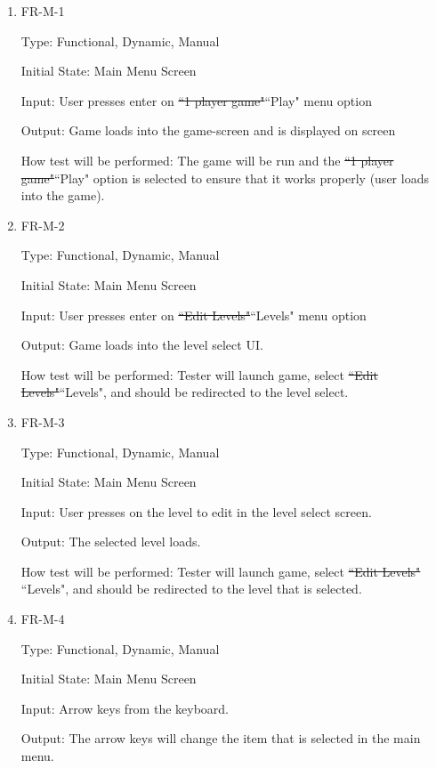\documentclass[12pt, titlepage]{article}
\begin{document}
\begin{enumerate}

\item{FR-M-1}

Type: Functional, Dynamic, Manual
					
Initial State: Main Menu Screen
					
Input: User presses enter on \color{Red}\sout{``1 player game"}``Play" \color{Black} menu option
					
Output: Game loads into the game-screen and is displayed on screen
					
How test will be performed: The game will be run and the \color{Red}\sout{``1 player game"}``Play"\color{Black} option is selected to ensure that it works properly (user loads into the game).
					
\item{FR-M-2}

Type: Functional, Dynamic, Manual
					
Initial State: Main Menu Screen
					
Input: User presses enter on \color{Red}\sout{``Edit Levels"}``Levels" \color{Black} menu option
					
Output: Game loads into the level select UI.
					
How test will be performed: Tester will launch game, select \color{Red}\sout{``Edit Levels"}``Levels"\color{Black}, and should be redirected to the level select.

\item{FR-M-3}

Type: Functional, Dynamic, Manual

Initial State: Main Menu Screen

Input: User presses on the level to edit in the level select screen.

Output: The selected level loads.

How test will be performed: Tester will launch game, select \color{Red}\sout{``Edit Levels"} ``Levels"\color{Black}, and should be redirected to the level that is selected.

\item{FR-M-4}

Type: Functional, Dynamic, Manual

Initial State: Main Menu Screen

Input: Arrow keys from the keyboard.

Output: The arrow keys will change the item that is selected in the main menu.


\end{enumerate}
\end{document}
